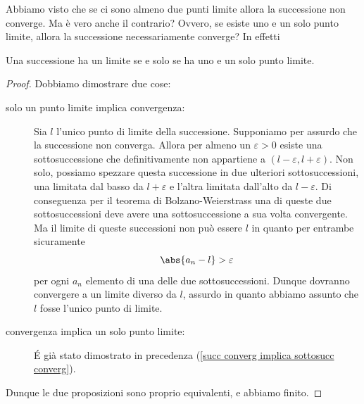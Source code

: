 \documentclass[11pt]{scrartcl}
\begin{document}
	Abbiamo visto che se ci sono almeno due punti limite allora la successione non converge. Ma è vero anche il contrario? Ovvero, se esiste uno e un solo punto limite, allora la successione necessariamente converge? In effetti
	\begin{theorem}
		Una successione ha un limite se e solo se ha uno e un solo punto limite.
	\end{theorem}
	\begin{proof}
		Dobbiamo dimostrare due cose:
		\begin{description}
			\item[solo un punto limite implica convergenza:] Sia $l$ l'unico punto di limite della successione. Supponiamo per assurdo che la successione non converga. Allora per almeno un $\varepsilon>0$ esiste una sottosuccessione che definitivamente non appartiene a $(l-\varepsilon,l+\varepsilon)$. Non solo, possiamo spezzare questa successione in due ulteriori sottosuccessioni, una limitata dal basso da $l+\varepsilon$ e l'altra limitata dall'alto da $l-\varepsilon$. Di conseguenza per il teorema di Bolzano-Weierstrass una di queste due sottosuccessioni deve avere una sottosuccessione a sua volta convergente. Ma il limite di queste successioni non può essere $l$ in quanto per entrambe sicuramente
			$$\abs{a_n-l}>\varepsilon$$
			per ogni $a_n$ elemento di una delle due sottosuccessioni. Dunque dovranno convergere a un limite diverso da $l$, assurdo in quanto abbiamo assunto che $l$ fosse l'unico punto di limite.
			\item[convergenza implica un solo punto limite:] \'E già stato dimostrato in precedenza (\ref{succ converg implica sottosucc converg}).
		\end{description}
		Dunque le due proposizioni sono proprio equivalenti, e abbiamo finito.
	\end{proof}
	
\end{document}
